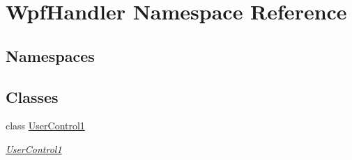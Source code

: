\hypertarget{namespace_wpf_handler}{}\section{Wpf\+Handler Namespace Reference}
\label{namespace_wpf_handler}
\subsection*{Namespaces}
\begin{DoxyCompactItemize}
\end{DoxyCompactItemize}
\subsection*{Classes}
\begin{DoxyCompactItemize}
\item 
class \mbox{\hyperlink{class_wpf_handler_1_1_user_control1}{User\+Control1}}
\begin{DoxyCompactList}\small\item\em \mbox{\hyperlink{class_wpf_handler_1_1_user_control1}{User\+Control1}} \end{DoxyCompactList}\end{DoxyCompactItemize}
